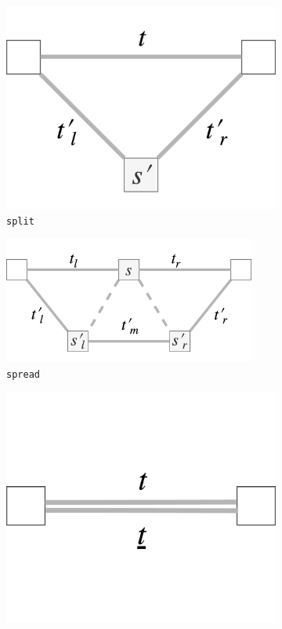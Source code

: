 \documentclass[12pt,a4paper,twoside,openright]{report}
\theoremstyle{definition}
\begin{document}
\begin{figure}[h]
  \centering
  \begin{subfigure}[t]{.28\textwidth}
    \centering\includegraphics[keepaspectratio,width=\textwidth]{prep/outer/split}
    \caption{\texttt{split}}
    \label{fig:splitOp}
  \end{subfigure}
  \begin{subfigure}[t]{.46\textwidth}
    \centering\includegraphics[keepaspectratio,width=0.91\textwidth]{prep/outer/spread}
    \caption{\texttt{spread}}
    \label{fig:spreadOP}
  \end{subfigure}
  \begin{subfigure}[t]{.24\textwidth}
    \centering\includegraphics[keepaspectratio,width=\textwidth]{prep/outer/freeze}

\end{subfigure}
\end{figure}
\end{document}
